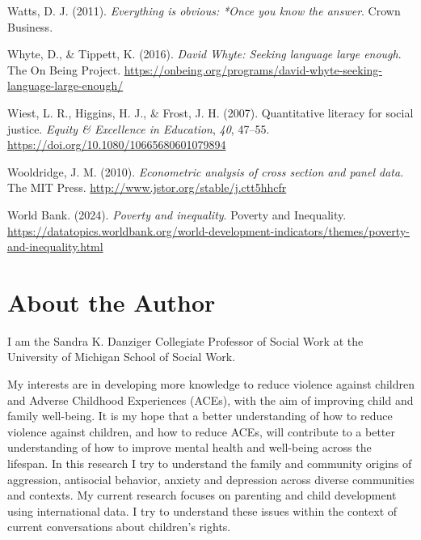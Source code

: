 \documentclass[
  letterpaper,
  DIV=11,
  numbers=noendperiod]{scrreprt}
\newlength{\cslhangindent}
\newenvironment{CSLReferences}[2] %
 {\begin{list}{}{%
  \setlength{\itemindent}{0pt}
  \setlength{\leftmargin}{0pt}
  \setlength{\parsep}{0pt}
  \ifodd #1
   \setlength{\leftmargin}{\cslhangindent}
   \setlength{\itemindent}{-1\cslhangindent}
  \fi
  \setlength{\itemsep}{#2\baselineskip}}}
 {\end{list}}
\begin{document}
\begin{CSLReferences}{1}{0}
Watts, D. J. (2011). \emph{Everything is obvious: *Once you know the
answer}. Crown Business.

Whyte, D., \& Tippett, K. (2016). \emph{{D}avid {W}hyte: Seeking
language large enough}. The On Being Project.
\url{https://onbeing.org/programs/david-whyte-seeking-language-large-enough/}

Wiest, L. R., Higgins, H. J., \& Frost, J. H. (2007). Quantitative
literacy for social justice. \emph{Equity \& Excellence in Education},
\emph{40}, 47--55. \url{https://doi.org/10.1080/10665680601079894}

Wooldridge, J. M. (2010). \emph{Econometric analysis of cross section
and panel data}. The MIT Press.
\url{http://www.jstor.org/stable/j.ctt5hhcfr}

World Bank. (2024). \emph{Poverty and inequality}. Poverty and
Inequality.
\url{https://datatopics.worldbank.org/world-development-indicators/themes/poverty-and-inequality.html}

\end{CSLReferences}


\chapter{About the Author}\label{about-the-author}

I am the Sandra K. Danziger Collegiate Professor of Social Work at the
University of Michigan School of Social Work.

My interests are in developing more knowledge to reduce violence against
children and Adverse Childhood Experiences (ACEs), with the aim of
improving child and family well-being. It is my hope that a better
understanding of how to reduce violence against children, and how to
reduce ACEs, will contribute to a better understanding of how to improve
mental health and well-being across the lifespan. In this research I try
to understand the family and community origins of aggression, antisocial
behavior, anxiety and depression across diverse communities and
contexts. My current research focuses on parenting and child development
using international data. I try to understand these issues within the
context of current conversations about children's rights.
\end{document}
